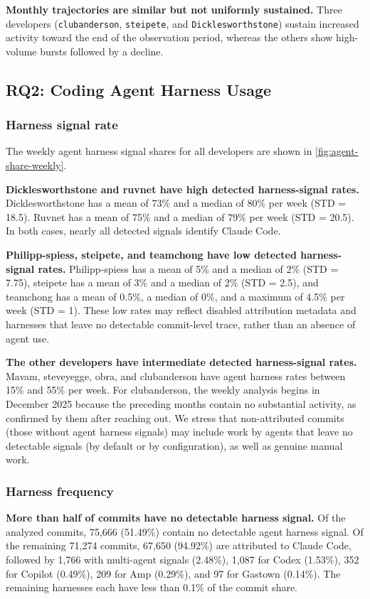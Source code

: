 \documentclass[smallextended]{svjour3}
\begin{document}
\textbf{Monthly trajectories are similar but not uniformly sustained.} Three
developers (\texttt{clubanderson}, \texttt{steipete}, and
\texttt{Dicklesworthstone}) sustain increased activity toward the end of the
observation period, whereas the others show high-volume bursts followed by a
decline.


\subsection{RQ2: Coding Agent Harness Usage}
\label{sec:rq2-results}

\subsubsection{Harness signal rate}
The weekly agent harness signal shares for all developers are shown in
\autoref{fig:agent-share-weekly}.

\textbf{Dicklesworthstone and ruvnet have high detected harness-signal rates.}
Dicklesworthstone has a mean of 73\% and a median of 80\% per week (STD =
18.5). Ruvnet has a mean of 75\% and a median of 79\% per week (STD = 20.5).
In both cases, nearly all detected signals identify Claude Code.

\textbf{Philipp-spiess, steipete, and teamchong have low detected
harness-signal rates.} Philipp-spiess has a mean of 5\% and a median of 2\%
(STD = 7.75), steipete has a mean of 3\% and a median of 2\% (STD = 2.5), and
teamchong has a mean of 0.5\%, a median of 0\%, and a maximum of 4.5\% per
week (STD = 1). These low rates may reflect disabled attribution metadata and
harnesses that leave no detectable commit-level trace, rather than an absence of
agent use.

\textbf{The other developers have intermediate detected harness-signal rates.}
Mavam, steveyegge, obra, and clubanderson have agent harness rates between 15\%
and 55\% per week. For clubanderson, the weekly analysis begins in December
2025 because the preceding months contain no substantial activity, as confirmed by them after reaching out.
We stress that non-attributed commits (those without agent harness signals) may include work by agents that leave no detectable signals (by default or by configuration), as well as genuine manual work.

\subsubsection{Harness frequency}
\textbf{More than half of commits have no detectable harness signal.} Of the
analyzed commits, 75,666 (51.49\%) contain no detectable agent harness signal.
Of the
remaining 71,274 commits, 67,650 (94.92\%) are attributed to Claude Code,
followed by 1,766 with multi-agent signals (2.48\%), 1,087 for Codex (1.53\%),
352 for Copilot (0.49\%), 209 for Amp (0.29\%), and 97 for Gastown (0.14\%).
The remaining harnesses each have less than 0.1\% of the commit share.
\end{document}
